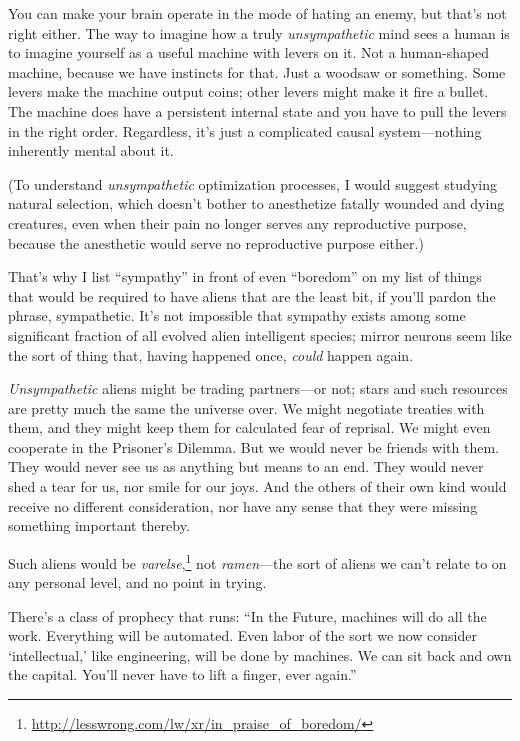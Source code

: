  You can make your brain operate in the mode of hating an enemy,
but that's not right either. The way to imagine how a
truly \textit{unsympathetic} mind sees a human is to imagine yourself
as a useful machine with levers on it. Not a human-shaped machine,
because we have instincts for that. Just a woodsaw or something. Some
levers make the machine output coins; other levers might make it fire a
bullet. The machine does have a persistent internal state and you have
to pull the levers in the right order. Regardless, it's
just a complicated causal system---nothing inherently mental about it.


 (To understand \textit{unsympathetic} optimization processes, I
would suggest studying natural selection, which doesn't
bother to anesthetize fatally wounded and dying creatures, even when
their pain no longer serves any reproductive purpose, because the
anesthetic would serve no reproductive purpose either.)


 That's why I list
``sympathy'' in front of even
``boredom'' on my list of things
that would be required to have aliens that are the least bit, if
you'll pardon the phrase, sympathetic.
It's not impossible that sympathy exists among some
significant fraction of all evolved alien intelligent species; mirror
neurons seem like the sort of thing that, having happened once,
\textit{could} happen again.


 \textit{Unsympathetic} aliens might be trading partners---or not;
stars and such resources are pretty much the same the universe over. We
might negotiate treaties with them, and they might keep them for
calculated fear of reprisal. We might even cooperate in the
Prisoner's Dilemma. But we would never be friends with
them. They would never see us as anything but means to an end. They
would never shed a tear for us, nor smile for our joys. And the others
of their own kind would receive no different consideration, nor have
any sense that they were missing something important thereby.


 Such aliens would be \textit{varelse},\footnote{\url{http://lesswrong.com/lw/xr/in_praise_of_boredom/}} not \textit{ramen}{}---the
sort of aliens we can't relate to on any personal
level, and no point in trying.

\myendsectiontext

\label{high_challenge}


 There's a class of prophecy that runs:
``In the Future, machines will do all the work.
Everything will be automated. Even labor of the sort we now consider
`intellectual,' like engineering, will
be done by machines. We can sit back and own the capital.
You'll never have to lift a finger, ever
again.'' 


